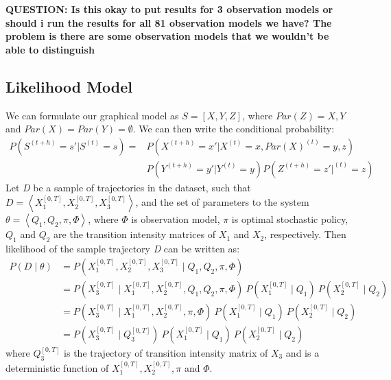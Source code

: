 \textbf{QUESTION: Is this okay to put results for 3 observation models or should i run the results for all 81 observation models we have? The problem is there are some observation models that we wouldn't be able to distinguish}
\subsection{Likelihood Model}
We can formulate our graphical model as $ S = [X, Y, Z] $, where $ Par(Z) = {X,Y} $ and $ Par(X) = Par(Y) =\emptyset $. We can then write the conditional probability:
\begin{equation}
\begin{split}
P\left(S^{\left(t+h\right)}=s' | S^{\left(t\right)}=s\right) = & P\left(X^{\left( t+h\right) }=x' | X^{\left(t\right)}=x, Par(X)^{\left(t\right)}={y,z}\right) \\&  P\left(Y^{\left( t+h\right) }=y' | Y^{\left(t\right)}=y\right) P\left(Z^{\left( t+h\right) }=z' | ^{\left(t\right)}=z\right)
\end{split} 
\end{equation}
Let \textit{D} be a sample of trajectories in the dataset, such that $ \textit{D} = \left\langle X_{1}^{[0, T]}, X_{2}^{[0, T]}, X_{3}^{[0, T]} \right\rangle  $, and the set of parameters to the system $  \theta = \left\langle Q_{1}, Q_{2}, \pi, \Phi \right\rangle  $, where $ \Phi $ is observation model, $ \pi $ is optimal stochastic policy, $ Q_{1} $ and $ Q_{2} $ are the transition intensity matrices of $ X_{1} $ and $ X_{2}$, respectively. Then likelihood of the sample trajectory \textit{D} can be written as:
\begin{align}
P(\textit{D} \mid \theta ) & = P(X_{1}^{[0, T]}, X_{2}^{[0, T]}, X_{3}^{[0, T]} \mid Q_{1}, Q_{2}, \pi, \Phi) \\ & = P(X_{3}^{[0, T]} \mid X_{1}^{[0, T]}, X_{2}^{[0, T]}, Q_{1}, Q_{2}, \pi, \Phi) \ P(X_{1}^{[0, T]}\mid Q_{1}) \ P(X_{2}^{[0, T]}\mid Q_{2}) \\ & = P(X_{3}^{[0, T]} \mid X_{1}^{[0, T]}, X_{2}^{[0, T]}, \pi, \Phi) \ P(X_{1}^{[0, T]}\mid Q_{1}) \ P(X_{2}^{[0, T]}\mid Q_{2}) \\ & = P(X_{3}^{[0, T]}\mid Q_{3}^{[0, T]}) \ P(X_{1}^{[0, T]}\mid Q_{1}) \ P(X_{2}^{[0, T]}\mid Q_{2}) 
\end{align}
where $ Q_{3}^{[0, T]} $ is the trajectory of transition intensity matrix of $X_{3}$ and is a deterministic function of $ X_{1}^{[0, T]}, X_{2}^{[0, T]}, \pi $ and $ \Phi $. \\

